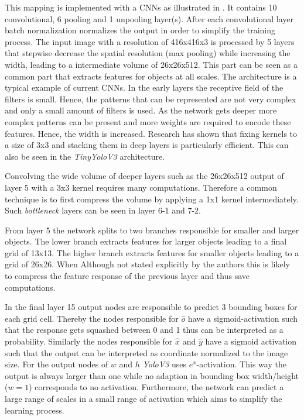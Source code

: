	This mapping is implemented with a \acp{CNN} as illustrated in  . It contains 10 convolutional, 6 pooling and 1 unpooling layer(s). After each convolutional layer batch normalization normalizes the output in order to simplify the training process.
	The input image with a resolution of 416x416x3 is processed by 5 layers that stepwise decrease the spatial resolution (max pooling) while increasing the width, leading to a intermediate volume of 26x26x512. This part can be seen as a common part that extracts features for objects at all scales. The architecture is a typical example of current \acp{CNN}. In the early layers the receptive field of the filters is small. Hence, the patterns that can be represented are not very complex and only a small amount of filters is used. As the network gets deeper more complex patterns can be present and more weights are required to encode these features. Hence, the width is increased. Research has shown that fixing kernels to a size of 3x3 and stacking them in deep layers is particularly efficient. This can also be seen in the \textit{TinyYoloV3} architecture. 
	
	Convolving the wide volume of deeper layers such as the 26x26x512  output of layer 5 with a 3x3 kernel requires many computations. Therefore a common technique is to first compress the volume by applying a 1x1 kernel intermediately. Such \textit{bottleneck} layers can be seen in layer 6-1 and 7-2.
	
	From layer 5 the network splits to two branches responsible for smaller and larger objects. The lower branch extracts features for larger objects leading to a final grid of 13x13. The higher branch extracts features for smaller objects leading to a grid of 26x26. When Although not stated explicitly by the authors this is likely to compress the feature response of the previous layer and thus save computations.
	
	In the final layer 15 output nodes are responsible to predict 3 bounding boxes for each grid cell. Thereby the nodes responsible for $\hat o$ have a sigmoid-activation such that the response gets squashed between 0 and 1 thus can be interpreted as a probability. Similarly the nodes responsible for $\hat x$ and $\hat y$ have a sigmoid activation such that the output can be interpreted as coordinate normalized to the image size. For the output nodes of $w$ and $h$ \textit{YoloV3} uses $e^x$-activation. This way the output is always larger than one while no adaption in bounding box width/height ($w=1$) corresponds to no activation. Furthermore, the network can predict a large range of scales in a small range of activation which aims to simplify the learning process.
	
